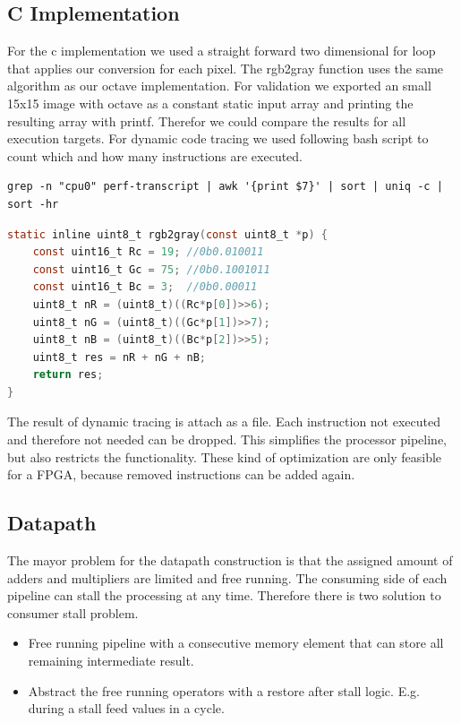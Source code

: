 \documentclass[a4paper,fontsize=12pt]{scrartcl}
\begin{document}
\subsection{C Implementation}

For the c implementation we used a straight forward two dimensional for loop that applies our conversion for each pixel. The rgb2gray function uses the same algorithm as our octave implementation. For validation we exported an small 15x15 image with octave as a constant static input array and printing the resulting array with printf. Therefor we could compare the results for all execution targets. For dynamic code tracing we used following bash script to count which and how many instructions are executed.

\begin{minipage}{\linewidth}

\begin{lstlisting}
grep -n "cpu0" perf-transcript | awk '{print $7}' | sort | uniq -c | sort -hr
\end{lstlisting}
\end{minipage}

\begin{minipage}{\linewidth}
\begin{lstlisting}[language=C]
static inline uint8_t rgb2gray(const uint8_t *p) {
	const uint16_t Rc = 19; //0b0.010011
	const uint16_t Gc = 75; //0b0.1001011
	const uint16_t Bc = 3;  //0b0.00011
	uint8_t nR = (uint8_t)((Rc*p[0])>>6);
	uint8_t nG = (uint8_t)((Gc*p[1])>>7);
	uint8_t nB = (uint8_t)((Bc*p[2])>>5);
	uint8_t res = nR + nG + nB;
	return res;
}
\end{lstlisting}
\end{minipage}

The result of dynamic tracing is attach as a file. Each instruction not executed and therefore not needed can be dropped. This simplifies the processor pipeline, but also restricts the functionality. These kind of optimization are only feasible for a FPGA, because removed instructions can be added again. 

\subsection{Datapath}
The mayor problem for the datapath construction is that the assigned amount of adders and multipliers are limited and free running. The consuming side of each pipeline can stall the processing at any time. Therefore there is two solution to consumer stall problem.
\begin{itemize}
	\item Free running pipeline with a consecutive memory element that can store all remaining intermediate result.
	
	\item Abstract the free running operators with a restore after stall logic. E.g. during a stall feed values in a cycle.  
\end{itemize}
\end{document}
